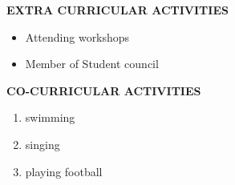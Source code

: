 \documentclass{article}
\begin{document}
\begin{flushleft}
	\vspace{0.2in}
	
		\textbf{EXTRA CURRICULAR ACTIVITIES}
	\begin{itemize}
		\item Attending workshops
	 	\item Member of Student council
	\end{itemize}
\end{flushleft}

\begin{flushleft}
	\vspace{0.2in}
	
		\textbf{CO-CURRICULAR ACTIVITIES}
	\begin{enumerate}
		\item swimming
	 	\item singing
		\item playing football
	\end{enumerate}
\end{flushleft}
\end{document}
